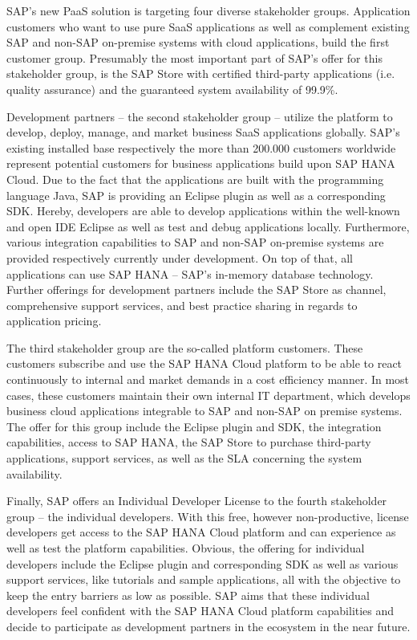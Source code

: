 SAP's new \ac{PaaS} solution is targeting four diverse stakeholder groups. Application customers who want to use pure \ac{SaaS} applications as well as complement existing SAP and non-SAP on-premise systems with cloud applications, build the first customer group. Presumably the most important part of SAP's offer for this stakeholder group, is the SAP Store with certified third-party applications (i.e. quality assurance) and the guaranteed system availability of 99.9\%.

Development partners -- the second stakeholder group -- utilize the platform to develop, deploy, manage, and market business \ac{SaaS} applications globally. SAP's existing installed base respectively the more than 200.000 customers worldwide represent potential customers for business applications build upon SAP HANA Cloud. Due to the fact that the applications are built with the programming language Java, SAP is providing an Eclipse plugin as well as a corresponding \ac{SDK}. Hereby, developers are able to develop applications within the well-known and open \ac{IDE} Eclipse as well as test and debug applications locally. Furthermore, various integration capabilities to SAP and non-SAP on-premise systems are provided respectively currently under development. On top of that, all applications can use SAP HANA -- SAP's in-memory database technology. Further offerings for development partners include the SAP Store as channel, comprehensive support services, and best practice sharing in regards to application pricing.

The third stakeholder group are the so-called platform customers. These customers subscribe and use the SAP HANA Cloud platform to be able to react continuously to internal and market demands in a cost efficiency manner. In most cases, these customers maintain their own internal \ac{IT} department, which develops business cloud applications integrable to SAP and non-SAP on premise systems. The offer for this group include the Eclipse plugin and \ac{SDK}, the integration capabilities, access to SAP HANA, the SAP Store to purchase third-party applications, support services, as well as the \ac{SLA} concerning the system availability.

Finally, SAP offers an Individual Developer License to the fourth stakeholder group -- the individual developers. With this free, however non-productive, license developers get access to the SAP HANA Cloud platform and can experience as well as test the platform capabilities. Obvious, the offering for individual developers include the Eclipse plugin and corresponding \ac{SDK} as well as various support services, like tutorials and sample applications, all with the objective to keep the entry barriers as low as possible. SAP aims that these individual developers feel confident with the SAP HANA Cloud platform capabilities and decide to participate as development partners in the ecosystem in the near future.

